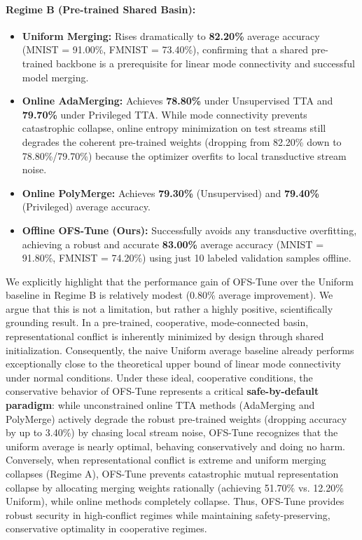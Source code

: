 \paragraph{Regime B (Pre-trained Shared Basin):}
\begin{itemize}
    \item \textbf{Uniform Merging:} Rises dramatically to \textbf{82.20\%} average accuracy (MNIST = 91.00\%, FMNIST = 73.40\%), confirming that a shared pre-trained backbone is a prerequisite for linear mode connectivity and successful model merging.
    \item \textbf{Online AdaMerging:} Achieves \textbf{78.80\%} under Unsupervised TTA and \textbf{79.70\%} under Privileged TTA.
While mode connectivity prevents catastrophic collapse, online entropy minimization on test streams still degrades the coherent pre-trained weights (dropping from 82.20\% down to 78.80\%/79.70\%) because the optimizer overfits to local transductive stream noise.
    \item \textbf{Online PolyMerge:} Achieves \textbf{79.30\%} (Unsupervised) and \textbf{79.40\%} (Privileged) average accuracy.
    \item \textbf{Offline OFS-Tune (Ours):} Successfully avoids any transductive overfitting, achieving a robust and accurate \textbf{83.00\%} average accuracy (MNIST = 91.80\%, FMNIST = 74.20\%) using just 10 labeled validation samples offline. 
\end{itemize}

We explicitly highlight that the performance gain of OFS-Tune over the Uniform baseline in Regime B is relatively modest (0.80\% average improvement).
We argue that this is not a limitation, but rather a highly positive, scientifically grounding result.
In a pre-trained, cooperative, mode-connected basin, representational conflict is inherently minimized by design through shared initialization.
Consequently, the naive Uniform average baseline already performs exceptionally close to the theoretical upper bound of linear mode connectivity under normal conditions.
Under these ideal, cooperative conditions, the conservative behavior of OFS-Tune represents a critical \textbf{safe-by-default paradigm}: while unconstrained online TTA methods (AdaMerging and PolyMerge) actively degrade the robust pre-trained weights (dropping accuracy by up to 3.40\%) by chasing local stream noise, OFS-Tune recognizes that the uniform average is nearly optimal, behaving conservatively and doing no harm.
Conversely, when representational conflict is extreme and uniform merging collapses (Regime A), OFS-Tune prevents catastrophic mutual representation collapse by allocating merging weights rationally (achieving 51.70\% vs.
12.20\% Uniform), while online methods completely collapse.
Thus, OFS-Tune provides robust security in high-conflict regimes while maintaining safety-preserving, conservative optimality in cooperative regimes.

